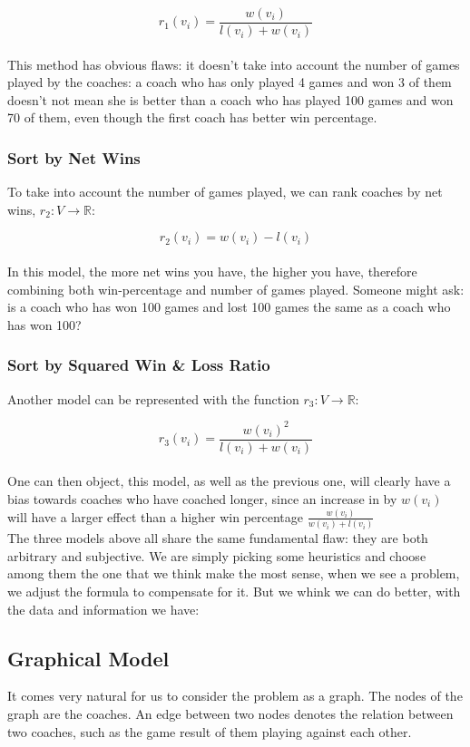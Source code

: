 \documentclass[titlepage]{article}
\begin{document}
$$r_1(v_i) = \frac{w(v_i)}{l(v_i) + w(v_i)}$$
\\

\noindent This method has obvious flaws: it doesn't take into account the number of games played by the coaches: a coach who has only played 4 games and won 3 of them doesn't not mean she is better than a coach who has played 100 games and won 70 of them, even though the first coach has better win percentage.

\subsubsection{Sort by Net Wins}
To take into account the number of games played, we can rank coaches by net wins, $r_2: V \rightarrow \mathbb{R}$:

$$r_2(v_i) = w(v_i) - l(v_i)$$
\\

\noindent In this model, the more net wins you have, the higher you have, therefore combining both win-percentage and number of games played. Someone might ask: is a coach who has won 100 games and lost 100 games the same as a coach who has won 100?

\subsubsection{Sort by Squared Win \& Loss Ratio}
Another model can be represented with the function $r_3: V \rightarrow \mathbb{R}$:

$$r_3(v_i) = \frac{w(v_i)^2}{l(v_i) + w(v_i)}$$
\\

\noindent One can then object, this model, as well as the previous one, will clearly have a bias towards coaches who have coached longer, since an increase in by $w(v_i)$ will have a larger effect than a higher win percentage $\frac{w(v_i)}{w(v_i) + l(v_i)}$
\\

\noindent The three models above all share the same fundamental flaw: they are both arbitrary and subjective. We are simply picking some heuristics and choose among them the one that we think make the most sense, when we see a problem, we adjust the formula to compensate for it. But we whink we can do better, with the data and information we have:

\subsection{Graphical Model}
It comes very natural for us to consider the problem as a graph. The nodes of the graph are the coaches. An edge between two nodes denotes the relation between two coaches, such as the game result of them playing against each other.
\\
\end{document}
